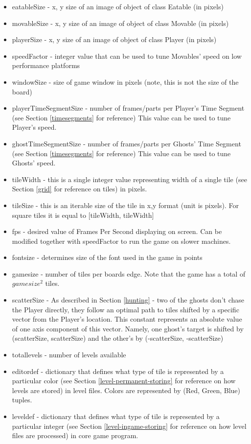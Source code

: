 \documentclass[11pt,a4paper,notitlepage]{report}
\begin{document}
				\begin{itemize}
					\item
						eatableSize - x, y size of an image of object of class Eatable (in pixels)
					\item
						movableSize - x, y size of an image of object of class Movable (in pixels)
					\item
						playerSize - x, y size of an image of object of class Player (in pixels)
					\item
						speedFactor - integer value that can be used to tune Movables' speed on low performance platforms
					\item
						windowSize - size of game window in pixels (note, this is not the size of the board)
					\item
						playerTimeSegmentSize - number of frames/parts per Player's Time Segment (see Section \ref{timesegments} for reference) This value can be used to tune Player's speed.
					\item
						ghostTimeSegmentSize - number of frames/parts per Ghosts' Time Segment (see Section \ref{timesegments} for reference)  This value can be used to tune Ghosts' speed.
					\item
						tileWidth - this is a single integer value representing width of a single tile (see Section \ref{grid} for reference on tiles) in pixels.
					\item
						tileSize - this is an iterable size of the tile in x,y format (unit is pixels). For square tiles it is equal to [tileWidth, tileWidth]
					\item
						fps - desired value of Frames Per Second displaying on screen. Can be modified together with speedFactor to run the game on slower machines.
					\item
						fontsize - determines size of the font used in the game in points
					\item
						gamesize - number of tiles per boards edge. Note that the game has a total of $gamesize^2$ tiles.
					\item
						scatterSize - As described in Section \ref{hunting} - two of the ghosts don't chase the Player directly, they follow an optimal path to tiles shifted by a specific vector from the Player's location. This constant represents an absolute value of one axis component of this vector. Namely, one ghost's target is shifted by (scatterSize, scatterSize) and the other's by (-scatterSize, -scatterSize)
					\item
						totallevels - number of levels available
					\item
						editordef - dictionary that defines what type of tile is represented by a particular color (see Section \ref{level-permanent-storing} for reference on how levels are stored) in level files. Colors are represented by (Red, Green, Blue) tuples.
					\item
						leveldef - dictionary that defines what type of tile is represented by a particular integer (see Section \ref{level-ingame-storing} for reference on how level files are processed) in core game program.
				\end{itemize}
\end{document}
